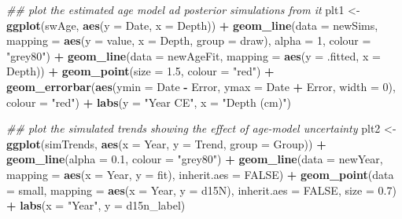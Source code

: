 \documentclass[12pt,]{article}
\newenvironment{Shaded}{\begin{snugshade}}{\end{snugshade}}
\newcommand{\CommentTok}[1]{\textcolor[rgb]{0.56,0.35,0.01}{\textit{#1}}}
\newcommand{\DataTypeTok}[1]{\textcolor[rgb]{0.13,0.29,0.53}{#1}}
\newcommand{\DecValTok}[1]{\textcolor[rgb]{0.00,0.00,0.81}{#1}}
\newcommand{\FloatTok}[1]{\textcolor[rgb]{0.00,0.00,0.81}{#1}}
\newcommand{\KeywordTok}[1]{\textcolor[rgb]{0.13,0.29,0.53}{\textbf{#1}}}
\newcommand{\NormalTok}[1]{#1}
\newcommand{\OperatorTok}[1]{\textcolor[rgb]{0.81,0.36,0.00}{\textbf{#1}}}
\newcommand{\OtherTok}[1]{\textcolor[rgb]{0.56,0.35,0.01}{#1}}
\newcommand{\StringTok}[1]{\textcolor[rgb]{0.31,0.60,0.02}{#1}}
\begin{document}
\begin{Shaded}
\begin{Highlighting}[]
\CommentTok{## plot the estimated age model ad posterior simulations from it}
\NormalTok{plt1 <-}\StringTok{ }\KeywordTok{ggplot}\NormalTok{(swAge, }\KeywordTok{aes}\NormalTok{(}\DataTypeTok{y =}\NormalTok{ Date, }\DataTypeTok{x =}\NormalTok{ Depth)) }\OperatorTok{+}
\StringTok{    }\KeywordTok{geom_line}\NormalTok{(}\DataTypeTok{data =}\NormalTok{ newSims,}
              \DataTypeTok{mapping =} \KeywordTok{aes}\NormalTok{(}\DataTypeTok{y =}\NormalTok{ value, }\DataTypeTok{x =}\NormalTok{ Depth, }\DataTypeTok{group =}\NormalTok{ draw),}
              \DataTypeTok{alpha =} \DecValTok{1}\NormalTok{, }\DataTypeTok{colour =} \StringTok{"grey80"}\NormalTok{) }\OperatorTok{+}
\StringTok{    }\KeywordTok{geom_line}\NormalTok{(}\DataTypeTok{data =}\NormalTok{ newAgeFit, }\DataTypeTok{mapping =} \KeywordTok{aes}\NormalTok{(}\DataTypeTok{y =}\NormalTok{ .fitted, }\DataTypeTok{x =}\NormalTok{ Depth)) }\OperatorTok{+}
\StringTok{    }\KeywordTok{geom_point}\NormalTok{(}\DataTypeTok{size =} \FloatTok{1.5}\NormalTok{, }\DataTypeTok{colour =} \StringTok{"red"}\NormalTok{) }\OperatorTok{+}
\StringTok{    }\KeywordTok{geom_errorbar}\NormalTok{(}\KeywordTok{aes}\NormalTok{(}\DataTypeTok{ymin =}\NormalTok{ Date }\OperatorTok{-}\StringTok{ }\NormalTok{Error, }\DataTypeTok{ymax =}\NormalTok{ Date }\OperatorTok{+}\StringTok{ }\NormalTok{Error, }\DataTypeTok{width =} \DecValTok{0}\NormalTok{),}
                  \DataTypeTok{colour =} \StringTok{"red"}\NormalTok{) }\OperatorTok{+}
\StringTok{    }\KeywordTok{labs}\NormalTok{(}\DataTypeTok{y =} \StringTok{"Year CE"}\NormalTok{, }\DataTypeTok{x =} \StringTok{"Depth (cm)"}\NormalTok{)}

\CommentTok{## plot the simulated trends showing the effect of age-model uncertainty}
\NormalTok{plt2 <-}\StringTok{ }\KeywordTok{ggplot}\NormalTok{(simTrends, }\KeywordTok{aes}\NormalTok{(}\DataTypeTok{x =}\NormalTok{ Year, }\DataTypeTok{y =}\NormalTok{ Trend, }\DataTypeTok{group =}\NormalTok{ Group)) }\OperatorTok{+}
\StringTok{    }\KeywordTok{geom_line}\NormalTok{(}\DataTypeTok{alpha =} \FloatTok{0.1}\NormalTok{, }\DataTypeTok{colour =} \StringTok{"grey80"}\NormalTok{) }\OperatorTok{+}
\StringTok{    }\KeywordTok{geom_line}\NormalTok{(}\DataTypeTok{data =}\NormalTok{ newYear,}
              \DataTypeTok{mapping =} \KeywordTok{aes}\NormalTok{(}\DataTypeTok{x =}\NormalTok{ Year, }\DataTypeTok{y =}\NormalTok{ fit), }\DataTypeTok{inherit.aes =} \OtherTok{FALSE}\NormalTok{) }\OperatorTok{+}
\StringTok{    }\KeywordTok{geom_point}\NormalTok{(}\DataTypeTok{data =}\NormalTok{ small,}
               \DataTypeTok{mapping =} \KeywordTok{aes}\NormalTok{(}\DataTypeTok{x =}\NormalTok{ Year, }\DataTypeTok{y =}\NormalTok{ d15N),}
               \DataTypeTok{inherit.aes =} \OtherTok{FALSE}\NormalTok{, }\DataTypeTok{size =} \FloatTok{0.7}\NormalTok{) }\OperatorTok{+}
\StringTok{    }\KeywordTok{labs}\NormalTok{(}\DataTypeTok{x =} \StringTok{"Year"}\NormalTok{, }\DataTypeTok{y =}\NormalTok{ d15n_label)}


\end{Highlighting}
\end{Shaded}
\end{document}
